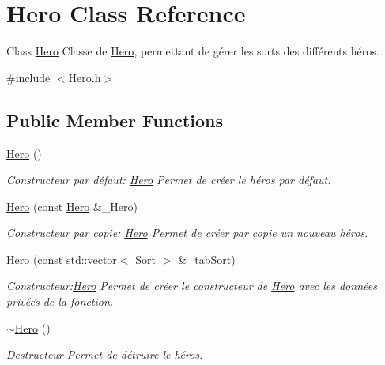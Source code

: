 \hypertarget{classHero}{}\section{Hero Class Reference}
\label{classHero}


Class \hyperlink{classHero}{Hero} Classe de \hyperlink{classHero}{Hero}, permettant de gérer les sorts des différents héros.  




{\ttfamily \#include $<$Hero.\+h$>$}

\subsection*{Public Member Functions}
\begin{DoxyCompactItemize}
\item 
\hyperlink{classHero_ab5920677a4b5cb59d6f513922d037dca}{Hero} ()
\begin{DoxyCompactList}\small\item\em Constructeur par défaut\+: \hyperlink{classHero}{Hero} Permet de créer le héros par défaut. \end{DoxyCompactList}\item 
\hyperlink{classHero_aaf432046f7dcf546db3e24c7976e8df7}{Hero} (const \hyperlink{classHero}{Hero} \&\+\_\+\+Hero)
\begin{DoxyCompactList}\small\item\em Constructeur par copie\+: \hyperlink{classHero}{Hero} Permet de créer par copie un nouveau héros. \end{DoxyCompactList}\item 
\hyperlink{classHero_a2fab78b80b87c8aa7a45b1ba38272795}{Hero} (const std\+::vector$<$ \hyperlink{classSort}{Sort} $>$ \&\+\_\+tab\+Sort)
\begin{DoxyCompactList}\small\item\em Constructeur\+:\hyperlink{classHero}{Hero} Permet de créer le constructeur de \hyperlink{classHero}{Hero} avec les données privées de la fonction. \end{DoxyCompactList}\item 
\mbox{\label{classHero_a5aeef41ede5a80dc29c5acd7b553c4da}} 
\hyperlink{classHero_a5aeef41ede5a80dc29c5acd7b553c4da}{$\sim$\+Hero} ()
\begin{DoxyCompactList}\small\item\em Destructeur Permet de détruire le héros. \end{DoxyCompactList}\item 

\end{DoxyCompactItemize}
